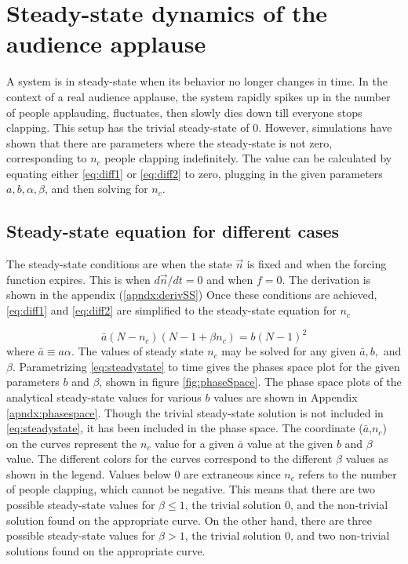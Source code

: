 \chapter{Steady-state dynamics of the audience applause}
\label{chap3}

\hspace{\parindent} A system is in steady-state when its behavior no longer changes in time. In the context of a real audience applause, the system rapidly spikes up in the number of people applauding, fluctuates, then slowly dies down till everyone stops clapping. This setup has the trivial steady-state of $0$.
However, simulations have shown that there are parameters where the steady-state is not zero, corresponding to $n_{c}$ people clapping indefinitely.
The value can be calculated by equating either \eqref{eq:diff1} or \eqref{eq:diff2} to zero, plugging in the given parameters $a, b, \alpha, \beta$, and then solving for $n_{c}$.

\section{Steady-state equation for different cases}

\hspace{\parindent} The steady-state conditions are when the state $\vec{n}$ is fixed and when the forcing function expires. 
This is when $d\vec{n}/dt = 0$ and when $f=0$.
The derivation is shown in the appendix (\ref{apndx:derivSS})
Once these conditions are achieved, \eqref{eq:diff1} and \eqref{eq:diff2} are simplified to the steady-state equation for $n_c$

\begin{equation}\label{eq:steadystate}
\bar{a}(N-n_{c})(N-1 + \beta n_{c}) = b(N-1)^{2}
\end{equation} where $\bar{a}\equiv a\alpha$. 
The values of steady state $n_{c}$ may be solved for any given $\bar{a},b,$ and $\beta$.
Parametrizing \eqref{eq:steadystate} to time gives the phases space plot for the given parameters $b$ and $\beta$, shown in figure \ref{fig:phaseSpace}.
The phase space plots of the analytical steady-state values for various $b$ values are shown in Appendix \ref{apndx:phasespace}.
Though the trivial steady-state solution is not included in \eqref{eq:steadystate}, it has been included in the phase space.
The coordinate ($\bar{a}$,$n_{c}$) on the curves represent the $n_{c}$ value for a given $\bar{a}$ value at the given $b$ and $\beta$ value.
The different colors for the curves correspond to the different $\beta$ values as shown in the legend.
Values below $0$ are extraneous since $n_{c}$ refers to the number of people clapping, which cannot be negative.
This means that there are two possible steady-state values for $\beta \leq 1$, the trivial solution $0$, and the non-trivial solution found on the appropriate curve.
On the other hand, there are three possible steady-state values for $\beta > 1$, the trivial solution $0$, and two non-trivial solutions found on the appropriate curve.

